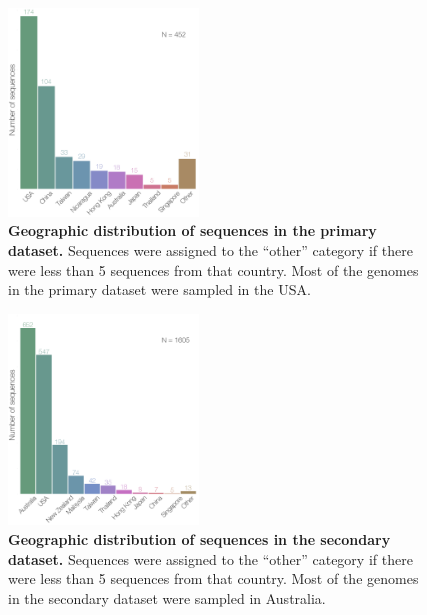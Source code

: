 \documentclass[11pt,oneside,letterpaper]{article}
\begin{document}
\begin{figure}
\centering  
\includegraphics[width=0.45\textwidth]  {supp_figures/InfB_seqCountries.452.png}
\caption{\textbf{Geographic distribution of sequences in the primary dataset.}
Sequences were assigned to the ``other'' category if there were less than 5 sequences from that country.
Most of the genomes in the primary dataset were sampled in the USA.}
\label{geoSeqs4}
\end{figure}

\begin{figure}
\centering  
\includegraphics[width=0.45\textwidth]  {supp_figures/InfB_seqCountries.1600.png}
\caption{\textbf{Geographic distribution of sequences in the secondary dataset.}
Sequences were assigned to the ``other'' category if there were less than 5 sequences from that country.
Most of the genomes in the secondary dataset were sampled in Australia.}
\label{geoSeqs1600}
\end{figure}
\end{document}

